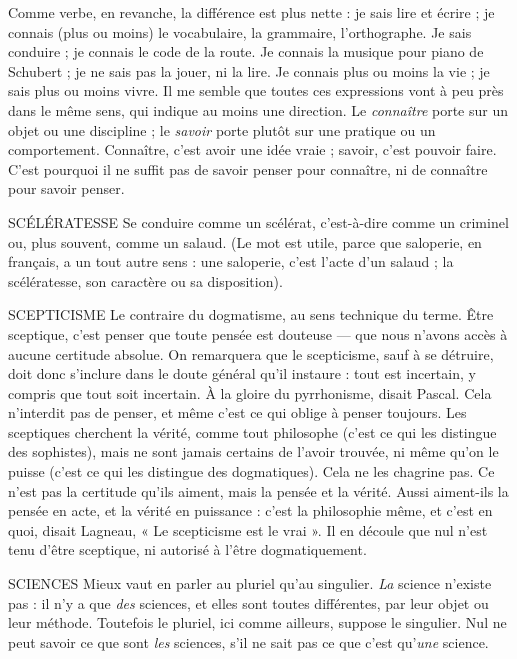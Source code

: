 Comme verbe, en revanche, la différence est plus nette : je sais lire et
écrire ; je connais (plus ou moins) le vocabulaire, la grammaire, l'orthographe.
Je sais conduire ; je connais le code de la route. Je connais la musique pour
piano de Schubert ; je ne sais pas la jouer, ni la lire. Je connais plus ou moins
la vie ; je sais plus ou moins vivre. Il me semble que toutes ces expressions vont
à peu près dans le même sens, qui indique au moins une direction. Le {\it connaître}
porte sur un objet ou une discipline ; le {\it savoir} porte plutôt sur une pratique ou
un comportement. Connaître, c’est avoir une idée vraie ; savoir, c’est pouvoir
faire. C’est pourquoi il ne suffit pas de savoir penser pour connaître, ni de
connaître pour savoir penser.

SCÉLÉRATESSE Se conduire comme un scélérat, c’est-à-dire comme un criminel
ou, plus souvent, comme un salaud. (Le mot est
utile, parce que saloperie, en français, a un tout autre sens : une saloperie, c’est
l’acte d’un salaud ; la scélératesse, son caractère ou sa disposition).

SCEPTICISME Le contraire du dogmatisme, au sens technique du terme.
Être sceptique, c’est penser que toute pensée est douteuse —
que nous n’avons accès à aucune certitude absolue. On remarquera que le scepticisme,
sauf à se détruire, doit donc s’inclure dans le doute général qu’il
instaure : tout est incertain, y compris que tout soit incertain. À la gloire du
pyrrhonisme, disait Pascal. Cela n’interdit pas de penser, et même c’est ce qui
oblige à penser toujours. Les sceptiques cherchent la vérité, comme tout philosophe
(c’est ce qui les distingue des sophistes), mais ne sont jamais certains de
l'avoir trouvée, ni même qu’on le puisse (c’est ce qui les distingue des
dogmatiques). Cela ne les chagrine pas. Ce n’est pas la certitude qu’ils aiment,
mais la pensée et la vérité. Aussi aiment-ils la pensée en acte, et la vérité en
puissance : c’est la philosophie même, et c’est en quoi, disait Lagneau, « Le scepticisme
est le vrai ». Il en découle que nul n’est tenu d’être sceptique, ni autorisé
à l’être dogmatiquement.

SCIENCES Mieux vaut en parler au pluriel qu’au singulier. {\it La} science
n'existe pas : il n’y a que {\it des} sciences, et elles sont toutes différentes,
par leur objet ou leur méthode. Toutefois le pluriel, ici comme ailleurs,
suppose le singulier. Nul ne peut savoir ce que sont {\it les} sciences, s’il ne sait pas
ce que c’est qu’{\it une} science.

